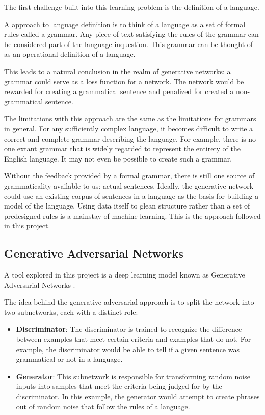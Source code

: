\documentclass[11pt]{article}
\begin{document}
The first challenge built into this learning problem is the definition of a language.

A approach to language definition is to think of a language as a set of formal rules called a grammar\cite{nltk_book}. Any piece of text satisfying the rules of the grammar can be considered part of the language inquestion. This grammar can be thought of as an operational definition of a language.

This leads to a natural conclusion in the realm of generative networks: a grammar could serve as a loss function for a network. The network would be rewarded for creating a grammatical sentence and penalized for created a non-grammatical sentence.

The limitations with this approach are the same as the limitations for grammars in general. For any sufficiently complex language, it becomes difficult to write a correct and complete grammar describing the language. For example, there is no one extant grammar that is widely regarded to represent the entirety of the English language. It may not even be possible to create such a grammar.

Without the feedback provided by a formal grammar, there is still one source of grammaticality available to us: actual sentences. Ideally, the generative network could use an existing corpus of sentences in a language as the basis for building a model of the language. Using data itself to glean structure rather than a set of predesigned rules is a mainstay of machine learning. This is the approach followed in this project.

\subsection{Generative Adversarial Networks}

A tool explored in this project is a deep learning model known as Generative Adversarial Networks \cite{gen_adv_model}.

The idea behind the generative adversarial approach is to split the network into two subnetworks, each with a distinct role:

\begin{itemize}
    \item \textbf{Discriminator}: The discriminator is trained to recognize the difference between examples that meet certain criteria and examples that do not. For example, the discriminator would be able to tell if a given sentence was grammatical or not in a language.
    \item \textbf{Generator}: This subnetwork is responsible for transforming random noise inputs into samples that meet the criteria being judged for by the discriminator. In this example, the generator would attempt to create phrases out of random noise that follow the rules of a language.
\end{itemize}
\end{document}
